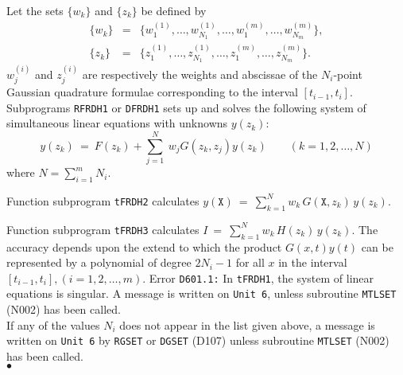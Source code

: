 \Method
Let the sets $\{w_k\}$ and $\{z_k\}$ be defined by
$$ \begin{array}{rcl}
\{w_k\} & = & \{w_1^{(1)},\ldots,w_{N_1}^{(1)},\ldots,
w_1^{(m)},\ldots,w_{N_m}^{(m)}\}, \\[3mm]
\{z_k\} & = & \{z_1^{(1)},\ldots,z_{N_1}^{(1)},\ldots,
z_1^{(m)},\ldots,z_{N_m}^{(m)}\}.
\end{array} $$
$w_j^{(i)}$ and $z_j^{(i)}$ are respectively the weights and
abscissae of the $N_i$-point Gaussian quadrature formulae corresponding
to the interval $[t_{i-1},t_i]$.
Subprograms {\tt RFRDH1} or {\tt DFRDH1} sets up and solves the following
system of
simultaneous linear equations with unknowns $y(z_k)$:
$$ y(z_k) \ = \ F(z_k) + \displaystyle
\sum_{j=1}^N \ w_j G(z_k,z_j) y(z_k) \qquad (k = 1,2,\ldots,N) $$
where $N = \sum_{i=1}^m N_i$.
\par
Function subprogram {\tt tFRDH2} calculates \qquad
$y(\mathtt{X}) \ = \ \displaystyle \sum_{k=1}^N
w_k\,G(\mathtt{X},z_k)\,y(z_k)$.
\par
Function subprogram {\tt tFRDH3} calculates \qquad
$I \ = \ \displaystyle \sum_{k=1}^N w_k\,H(z_k)\,y(z_k)$.
\Accuracy
The accuracy depends upon the extend to which the product $G(x,t)y(t)$
can be represented by a polynomial of degree $2N_i-1$ for all $x$ in the
interval $[t_{i-1},t_i],(i=1,2,\ldots,m)$.
\Errorh
Error {\tt D601.1:} In {\tt tFRDH1}, the system of
linear equations is singular. A message is written on {\tt Unit 6},
unless subroutine {\tt MTLSET} (N002) has been called. \\
If any of the values $N_i$ does not appear in the list given above,
a message is written on {\tt Unit 6} by {\tt RGSET} or {\tt DGSET}
(D107) unless subroutine {\tt MTLSET} (N002) has been called.
\\ $\bullet$
